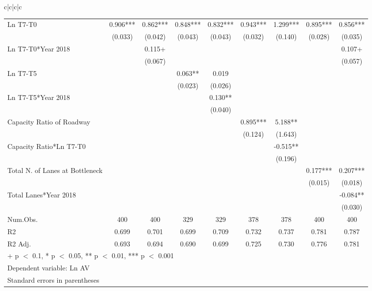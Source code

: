 \documentclass[
  letterpaper,
  authoryear]{elsarticle}
\begin{document}
\begin{table}
{\begin{tabular}[t]{c|c|c|c}
\begin{table}
\begin{table}
{\begin{tabular}[t]{lcccccccc}
Ln T7-T0 & 0.906*** & 0.862*** & 0.848*** & 0.832*** & 0.943*** & 1.299*** & 0.895*** & 0.856***\\
 & (0.033) & (0.042) & (0.043) & (0.043) & (0.032) & (0.140) & (0.028) & (0.035)\\
Ln T7-T0*Year 2018 &  & 0.115+ &  &  &  &  &  & 0.107+\\
 &  & (0.067) &  &  &  &  &  & (0.057)\\
Ln T7-T5 &  &  & 0.063** & 0.019 &  &  &  & \\
 &  &  & (0.023) & (0.026) &  &  &  & \\
Ln T7-T5*Year 2018 &  &  &  & 0.130** &  &  &  & \\
 &  &  &  & (0.040) &  &  &  & \\
Capacity Ratio of Roadway &  &  &  &  & 0.895*** & 5.188** &  & \\
 &  &  &  &  & (0.124) & (1.643) &  & \\
Capacity Ratio*Ln T7-T0 &  &  &  &  &  & -0.515** &  & \\
 &  &  &  &  &  & (0.196) &  & \\
Total N. of Lanes at Bottleneck &  &  &  &  &  &  & 0.177*** & 0.207***\\
 &  &  &  &  &  &  & (0.015) & (0.018)\\
Total Lanes*Year 2018 &  &  &  &  &  &  &  & -0.084**\\
 &  &  &  &  &  &  &  & (0.030)\\
\midrule
Num.Obs. & 400 & 400 & 329 & 329 & 378 & 378 & 400 & 400\\
R2 & 0.699 & 0.701 & 0.699 & 0.709 & 0.732 & 0.737 & 0.781 & 0.787\\
R2 Adj. & 0.693 & 0.694 & 0.690 & 0.699 & 0.725 & 0.730 & 0.776 & 0.781\\
\bottomrule
\multicolumn{9}{l}{\rule{0pt}{1em}+ p $<$ 0.1, * p $<$ 0.05, ** p $<$ 0.01, *** p $<$ 0.001}\\
\multicolumn{9}{l}{\rule{0pt}{1em}Dependent variable: Ln AV}\\
\multicolumn{9}{l}{\rule{0pt}{1em}Standard errors in parentheses}\\
\end{tabular}

}

\end{table}%


\end{table}
\end{tabular}}
\end{table}
\end{document}
